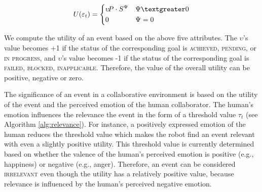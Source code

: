 \documentclass{article}
\begin{document}
\vspace*{-3mm}
\begin{equation}
    U(\varepsilon_t)= 
    \begin{dcases}
       \upsilon\!P\cdot S^{\Psi} & \Psi \textgreater 0 \\
       0               			 & \Psi = 0
    \end{dcases}
    \label{eqn:utility}
\end{equation}

We compute the utility of an event based on the above five attributes. The
$\upsilon$'s value becomes +1 if the status of the corresponding goal is
\textsc{achieved}, \textsc{pending}, or \textsc{in progress}, and $\upsilon$'s
value becomes -1 if the status of the corresponding goal is \textsc{failed,
blocked, inapplicable}. Therefore, the value of the overall utility can be
positive, negative or zero.

The significance of an event in a collaborative environment is based on the
utility of the event and the perceived emotion of the human collaborator. The
human's emotion influences the relevance the event in the form of a threshold
value $\tau_{t}$ (see Algorithm \ref{alg:relevance}). For instance, a positively
expressed emotion of the human reduces the threshold value which makes the robot
find an event relevant with even a slightly positive utility. This threshold
value is currently determined based on whether the valence of the human's
perceived emotion is positive (e.g., happiness) or negative (e.g., anger).
Therefore, an event can be considered \textsc{irrelevant} even though the
utility has a relatively positive value, because relevance is influenced by the
human's perceived negative emotion.
\end{document}
